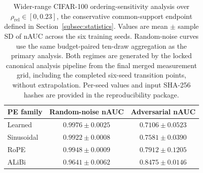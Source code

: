 \begin{table}[t]
\centering
\small
\caption{Wider-range CIFAR-100 ordering-sensitivity analysis over
$\rho_{\mathrm{rel}}\in[0,0.23]$, the conservative common-support
endpoint defined in Section~\ref{subsec:statistics}. Values are
mean $\pm$ sample SD of nAUC across the six training seeds. Random-noise
curves use the same budget-paired ten-draw aggregation as the primary
analysis. Both regimes are generated by the locked canonical analysis pipeline
from the final merged measurement grid, including the completed six-seed
transition points, without extrapolation. Per-seed values and input
SHA-256 hashes are provided in the reproducibility package.}
\label{tab:cifar-wide-range}
\begin{tabular}{lcc}
\toprule
PE family & Random-noise nAUC & Adversarial nAUC \\
\midrule
Learned & $0.9976 \pm 0.0025$ & $0.7106 \pm 0.0523$ \\
Sinusoidal & $0.9922 \pm 0.0008$ & $0.7581 \pm 0.0390$ \\
RoPE & $0.9948 \pm 0.0009$ & $0.7912 \pm 0.1205$ \\
ALiBi & $0.9641 \pm 0.0062$ & $0.8475 \pm 0.0146$ \\
\bottomrule
\end{tabular}
\end{table}
